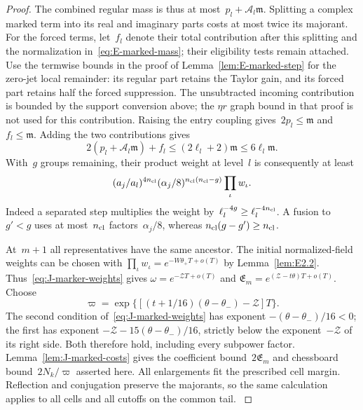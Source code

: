 \begin{proof}
The combined regular mass is thus at most~$p_l+\mathcal A_l\mathfrak m$. Splitting a complex marked term into its real and imaginary parts costs at most twice its majorant. For the forced terms, let~$f_l$ denote their total contribution after this splitting and the normalization in~\eqref{eq:E-marked-mass}; their eligibility tests remain attached. Use the termwise bounds in the proof of Lemma~\ref{lem:E-marked-step} for the zero-jet local remainder: its regular part retains the Taylor gain, and its forced part retains half the forced suppression. The unsubtracted incoming contribution is bounded by the support conversion above; the $\eta r$ graph bound in that proof is not used for this contribution. Raising the entry coupling gives~$2p_l\le\mathfrak m$ and~$f_l\le\mathfrak m$. Adding the two contributions gives
\begin{equation*}
2(p_l+\mathcal A_l\mathfrak m)+f_l
\le(2\ell_l+2)\mathfrak m\le6\ell_l\mathfrak m.
\end{equation*}
With~$g$ groups remaining, their product weight at level~$l$ is consequently at least
\begin{equation}\label{eq:J-marker-weights}
(a_j/a_l)^{4n_{\rm cl}}(\alpha_j/8)^{n_{\rm cl}(n_{\rm cl}-g)}\prod_\iota w_\iota.
\end{equation}
Indeed a separated step multiplies the weight by~$\ell_l^{-4g}\ge\ell_l^{-4n_{\rm cl}}$. A fusion to~$g'<g$ uses at most~$n_{\rm cl}$ factors~$\alpha_j/8$, whereas $n_{\rm cl}(g-g')\ge n_{\rm cl}$.

At~$m+1$ all representatives have the same ancestor. The initial normalized-field weights can be chosen with $\prod_\iota w_\iota=e^{-W\theta_+T+o(T)}$ by Lemma~\ref{lem:E2.2}. Thus~\eqref{eq:J-marker-weights} gives $\omega=e^{-\mathcal ZT+o(T)}$ and $\mathfrak E_m=e^{(\mathcal Z-t\theta)T+o(T)}$. Choose
\begin{equation}\label{eq:J-terminal-weight}
\varpi=\exp\{[(t+1/16)(\theta-\theta_-)-\mathcal Z]T\}.
\end{equation}
The second condition of~\eqref{eq:J-marked-weights} has exponent $-(\theta-\theta_-)/16<0$; the first has exponent $-\mathcal Z-15(\theta-\theta_-)/16$, strictly below the exponent~$-\mathcal Z$ of its right side. Both therefore hold, including every subpower factor. Lemma~\ref{lem:J-marked-costs} gives the coefficient bound~$2\mathfrak E_m$ and chessboard bound~$2N_k/\varpi$ asserted here. All enlargements fit the prescribed cell margin. Reflection and conjugation preserve the majorants, so the same calculation applies to all cells and all cutoffs on the common tail.
\label{proof:J-lattice-end}
\end{proof}


